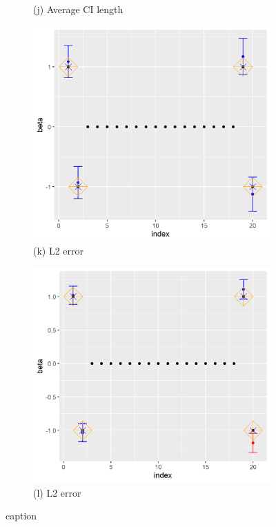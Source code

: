 \begin{figure}[ht!]
\begin{subfigure}[b]{.32\columnwidth}
    \caption{(j) Average CI length}
\end{subfigure}
\hfill
\centering
\begin{subfigure}[b]{.32\columnwidth} 
    \includegraphics[width=\columnwidth]{../../plot/p1_100_1_1.png}
    \caption{(k) L2 error}
\end{subfigure}
\hfill
\centering
\begin{subfigure}[b]{.32\columnwidth} 
    \includegraphics[width=\columnwidth]{../../plot/p2_100_1_1.png}
    \caption{(l) L2 error}
\end{subfigure}
\caption{caption}
\label{fig:individual}
\end{figure}